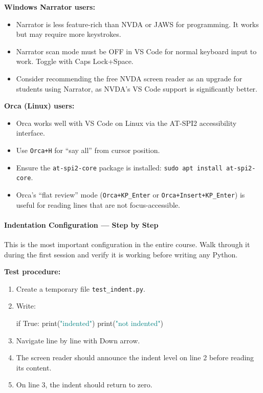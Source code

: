 \documentclass[
  justified,
  openright,
]{tufte-book}
\let\paragraph\paragraph
\newcommand{\BuiltInTok}[1]{#1}
\newcommand{\ControlFlowTok}[1]{\textcolor{BrandBlue}{#1}}
\newcommand{\NormalTok}[1]{#1}
\newcommand{\StringTok}[1]{\textcolor{Teal}{#1}}
\newcommand{\VariableTok}[1]{#1}
\newenvironment{Shaded}{%
  \begin{snugshade}
}{%
  \end{snugshade}
}
\let\paragraph\paragraph
\providecommand{\tightlist}{%
  \setlength{\itemsep}{0pt}\setlength{\parskip}{0pt}}
\begin{document}
\textbf{Windows Narrator users:}

\begin{itemize}
\tightlist
\item
  Narrator is less feature-rich than NVDA or JAWS for programming. It
  works but may require more keystrokes.
\item
  Narrator scan mode must be OFF in VS Code for normal keyboard input to
  work. Toggle with Caps Lock+Space.
\item
  Consider recommending the free NVDA screen reader as an upgrade for
  students using Narrator, as NVDA's VS Code support is significantly
  better.
\end{itemize}

\textbf{Orca (Linux) users:}

\begin{itemize}
\tightlist
\item
  Orca works well with VS Code on Linux via the AT-SPI2 accessibility
  interface.
\item
  Use \texttt{Orca+H} for ``say all'' from cursor position.
\item
  Ensure the \texttt{at-spi2-core} package is installed:
  \texttt{sudo\ apt\ install\ at-spi2-core}.
\item
  Orca's ``flat review'' mode (\texttt{Orca+KP\_Enter} or
  \texttt{Orca+Insert+KP\_Enter}) is useful for reading lines that are
  not focus-accessible.
\end{itemize}

\paragraph{Indentation Configuration --- Step by
Step}\label{indentation-configuration-step-by-step}

This is the most important configuration in the entire course. Walk
through it during the first session and verify it is working before
writing any Python.

\textbf{Test procedure:}

\begin{enumerate}
\def\labelenumi{\arabic{enumi}.}
\item
  Create a temporary file \texttt{test\_indent.py}.
\item
  Write:

\begin{Shaded}
\begin{Highlighting}[]
\ControlFlowTok{if} \VariableTok{True}\NormalTok{:}
    \BuiltInTok{print}\NormalTok{(}\StringTok{"indented"}\NormalTok{)}
\BuiltInTok{print}\NormalTok{(}\StringTok{"not indented"}\NormalTok{)}
\end{Highlighting}
\end{Shaded}
\item
  Navigate line by line with Down arrow.
\item
  The screen reader should announce the indent level on line 2 before
  reading its content.
\item
  On line 3, the indent should return to zero.
\end{enumerate}
\end{document}
